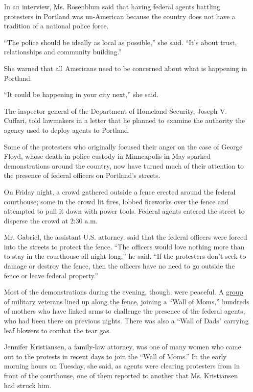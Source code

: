 In an interview, Ms. Rosenblum said that having federal agents battling
protesters in Portland was un-American because the country does not have
a tradition of a national police force.

``The police should be ideally as local as possible,'' she said. ``It's
about trust, relationships and community building.''

She warned that all Americans need to be concerned about what is
happening in Portland.

``It could be happening in your city next,'' she said.

The inspector general of the Department of Homeland Security, Joseph V.
Cuffari, told lawmakers in a letter that he planned to examine the
authority the agency used to deploy agents to Portland.

Some of the protesters who originally focused their anger on the case of
George Floyd, whose death in police custody in Minneapolis in May
sparked demonstrations around the country, now have turned much of their
attention to the presence of federal officers on Portland's streets.

On Friday night, a crowd gathered outside a fence erected around the
federal courthouse; some in the crowd lit fires, lobbed fireworks over
the fence and attempted to pull it down with power tools. Federal agents
entered the street to disperse the crowd at 2:30 a.m.

Mr. Gabriel, the assistant U.S. attorney, said that the federal officers
were forced into the streets to protect the fence. ``The officers would
love nothing more than to stay in the courthouse all night long,'' he
said. ``If the protesters don't seek to damage or destroy the fence,
then the officers have no need to go outside the fence or leave federal
property.''

Most of the demonstrations during the evening, though, were peaceful. A
\href{https://www.nytimes3xbfgragh.onion/2020/07/25/us/a-wall-of-vets-joins-the-front-lines-of-portland-protests.html}{group
of military veterans lined up along the fence}, joining a ``Wall of
Moms,'' hundreds of mothers who have linked arms to challenge the
presence of the federal agents, who had been there on previous nights.
There was also a ``Wall of Dads" carrying leaf blowers to combat the
tear gas.

Jennifer Kristiansen, a family-law attorney, was one of many women who
came out to the protests in recent days to join the ``Wall of Moms.'' In
the early morning hours on Tuesday, she said, as agents were clearing
protesters from in front of the courthouse, one of them reported to
another that Ms. Kristiansen had struck him.

